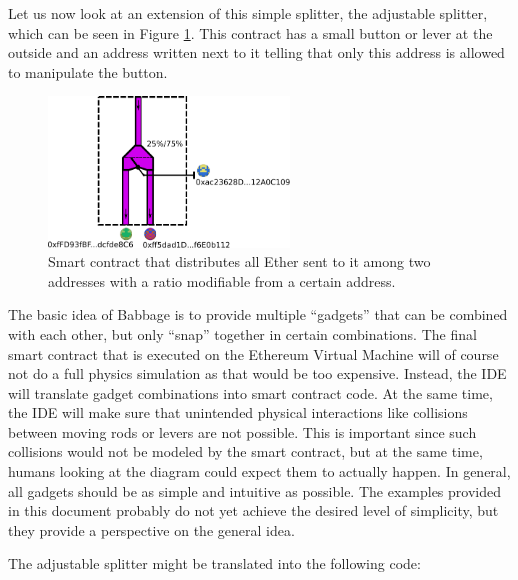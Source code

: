 \documentclass[11pt,letterpaper]{article}
\begin{document}
Let us now look at an extension of this simple splitter, the adjustable splitter,
which can be seen in Figure \ref{adjustable_splitter}.
This contract has a small button or lever at the outside and an address
written next to it telling that only this address is allowed to manipulate the
button.

\begin{figure}
\center
\includegraphics[height=4cm]{adjustable_splitter.pdf}
\caption{Smart contract that distributes all Ether sent to it among
two addresses with a ratio modifiable from a certain address.}
\label{adjustable_splitter}
\end{figure}

The basic idea of Babbage is to provide multiple ``gadgets'' that can be
combined with each other, but only ``snap'' together in certain combinations.
The final smart contract that is executed on the Ethereum Virtual Machine
will of course not do a full physics simulation as that would be too expensive.
Instead, the IDE will translate gadget combinations into smart contract code.
At the same time, the IDE will make sure that unintended physical interactions
like collisions between moving rods or levers are not possible. This is important
since such collisions
would not be modeled by the smart contract, but at the same time,
humans looking at the diagram could expect them to actually happen.
In general, all gadgets should be
as simple and intuitive as possible. The examples provided in this document probably
do not yet achieve the desired level of simplicity, but they provide a
perspective on the general idea.

The adjustable splitter might be translated into the following code:
\end{document}
